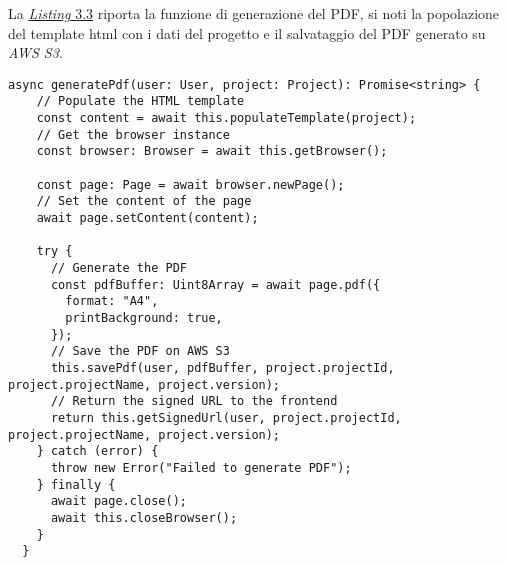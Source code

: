 \noindent La {\hyperref[lst:funzione-generazione-pdf]{\textit{Listing} 3.3}} riporta la funzione di generazione del PDF, si noti la popolazione del template \gls{html} con i dati del progetto e il salvataggio del PDF generato su \textit{AWS S3}.
\begin{lstlisting}[caption={Funzione di generazione del PDF, con salvataggio su \textit{AWS S3}}, label={lst:funzione-generazione-pdf}]
async generatePdf(user: User, project: Project): Promise<string> {
    // Populate the HTML template    
    const content = await this.populateTemplate(project);  
    // Get the browser instance
    const browser: Browser = await this.getBrowser(); 

    const page: Page = await browser.newPage();
    // Set the content of the page
    await page.setContent(content); 

    try {
      // Generate the PDF
      const pdfBuffer: Uint8Array = await page.pdf({
        format: "A4",
        printBackground: true,
      }); 
      // Save the PDF on AWS S3
      this.savePdf(user, pdfBuffer, project.projectId, project.projectName, project.version);  
      // Return the signed URL to the frontend
      return this.getSignedUrl(user, project.projectId, project.projectName, project.version);
    } catch (error) {
      throw new Error("Failed to generate PDF");
    } finally {
      await page.close();
      await this.closeBrowser();
    }
  }
\end{lstlisting}